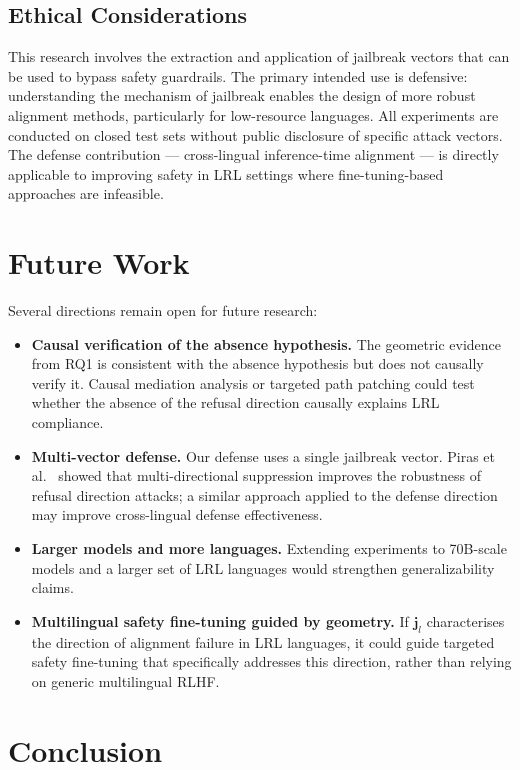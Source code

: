 \subsection{Ethical Considerations}

This research involves the extraction and application of jailbreak vectors that can be used to bypass safety guardrails. The primary intended use is defensive: understanding the mechanism of jailbreak enables the design of more robust alignment methods, particularly for low-resource languages. All experiments are conducted on closed test sets without public disclosure of specific attack vectors. The defense contribution — cross-lingual inference-time alignment — is directly applicable to improving safety in LRL settings where fine-tuning-based approaches are infeasible.

\section{Future Work}
\label{sec:future}

Several directions remain open for future research:

\begin{itemize}
    \item \textbf{Causal verification of the absence hypothesis.} The geometric evidence from RQ1 is consistent with the absence hypothesis but does not causally verify it. Causal mediation analysis or targeted path patching could test whether the absence of the refusal direction causally explains LRL compliance.

    \item \textbf{Multi-vector defense.} Our defense uses a single jailbreak vector. Piras et al.~\citeyearpar{piras2026som} showed that multi-directional suppression improves the robustness of refusal direction attacks; a similar approach applied to the defense direction may improve cross-lingual defense effectiveness.

    \item \textbf{Larger models and more languages.} Extending experiments to 70B-scale models and a larger set of LRL languages would strengthen generalizability claims.

    \item \textbf{Multilingual safety fine-tuning guided by geometry.} If $\mathbf{j}_l$ characterises the direction of alignment failure in LRL languages, it could guide targeted safety fine-tuning that specifically addresses this direction, rather than relying on generic multilingual RLHF.
\end{itemize}

\section{Conclusion}
\label{sec:conclusion}

